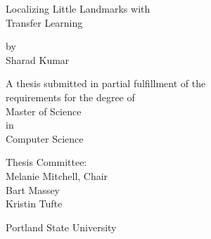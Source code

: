 \documentclass [11pt,letterpaper ,twoside ,openany ]{report}
\title{}
\date{}
\begin{document}
  \begin{titlepage}
      \begin{center}
          \vspace*{1cm}
          
          \Huge
          Localizing Little Landmarks with \\ 
          Transfer Learning
          
          
          \vspace{2cm}
          \normalsize
          by\\
          Sharad Kumar
          
          \vspace{5cm}
          
          \normalsize
          A thesis submitted in partial fulfillment of the \\
          requirements for the degree of \\
          Master of Science \\
          in \\
          Computer Science

          
          \vspace{3cm}
          
          Thesis Committee: \\
          Melanie Mitchell, Chair \\
          Bart Massey \\
          Kristin Tufte

          \vspace{1cm}
          Portland State University\\
          \the\year
          
      \end{center}
  \end{titlepage}
\end{document}
